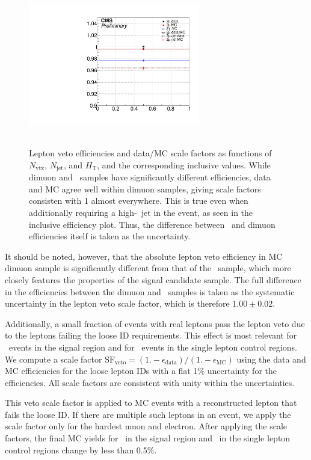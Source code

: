 \begin{figure}[tbph]
  \includegraphics[width=7.5cm,height=7cm]{Analysis/Figures/leptonveto/leptonveto_eff_incl.pdf}
  \caption{
    Lepton veto efficiencies and data/MC scale factors as functions of $N_{\text{vtx}}$, $N_{\text{jet}}$, and $H_{\mathrm{T}}$, and the corresponding inclusive values. 
    While dimuon and \zinvg\ samples have significantly different efficiencies, data and MC agree well within dimuon samples, giving scale factors consisten with 1 almost everywhere. 
    This is true even when additionally requiring a high-\pt\ jet in the event, as seen in the inclusive efficiency plot. 
    Thus, the difference between \zinvg\ and dimuon efficiencies itself is taken as the uncertainty.
  }
 \label{fig:leptonveto_efficiencies}
\end{figure}

It should be noted, however, that the absolute lepton veto efficiency in MC dimuon sample is significantly different from that of the \zinvg\ sample, which more closely features the properties of the signal candidate sample. 
The full difference in the efficiencies between the dimuon and \zinvg\ samples is taken as the systematic uncertainty in the lepton veto scale factor, which is therefore $1.00 \pm 0.02$.

Additionally, a small fraction of events with real leptons pass the lepton veto due to the leptons failing the loose ID requirements. 
This effect is most relevant for \wlng\ events in the signal region and for \zllg\ events in the single lepton control regions. 
We compute a scale factor $\text{SF}_{\text{veto}} = (1. - \epsilon_{\text{data}}) / (1. - \epsilon_{\text{MC}})$ using the data and MC efficiencies for the loose lepton IDs with a flat 1\% uncertainty for the efficiencies.
All scale factors are consistent with unity within the uncertainties. 

This veto scale factor is applied to MC events with a reconstructed lepton that fails the loose ID. 
If there are multiple such leptons in an event, we apply the scale factor only for the hardest muon and electron. 
After applying the scale factors, the final MC yields for \wlng\ in the signal  region and \zllg\ in the single lepton control regions change by less than 0.5\%.

